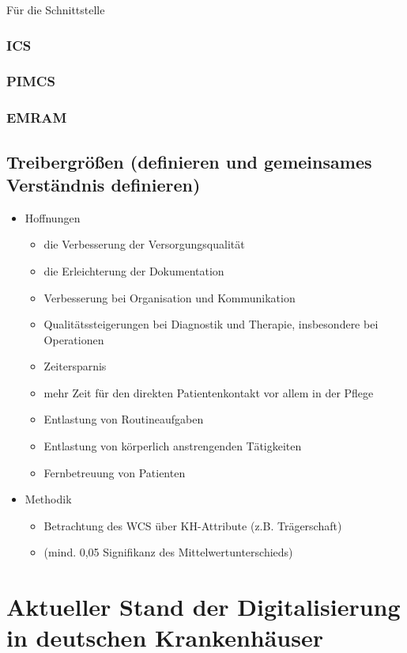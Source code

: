 		Für die Schnittstelle
	\subsubsection{ICS}
	\subsubsection{PIMCS}
	\subsubsection{EMRAM}
	\parencite{Stephani2019}
	\subsection{Treibergrößen (definieren und gemeinsames Verständnis definieren)}
	\begin{itemize}
		\item Hoffnungen \parencite[15]{braeutigam2017}
		\begin{itemize}
			\item die Verbesserung der Versorgungsqualität
			\item die Erleichterung der Dokumentation
			\item Verbesserung bei Organisation und Kommunikation
			\item Qualitätssteigerungen bei Diagnostik und Therapie, insbesondere bei Operationen
			\item Zeitersparnis
			\item mehr Zeit für den direkten Patientenkontakt vor allem in der Pflege
			\item Entlastung von Routineaufgaben
			\item Entlastung von körperlich anstrengenden Tätigkeiten
			\item Fernbetreuung von Patienten
		\end{itemize}
	\end{itemize}
	\begin{itemize}
		\item Methodik
		\begin{itemize}
			\item Betrachtung des WCS über KH-Attribute (z.B. Trägerschaft)
			\item (mind. 0,05 Signifikanz des Mittelwertunterschieds)
		\end{itemize}
	\end{itemize}
\section{Aktueller Stand der Digitalisierung in deutschen Krankenhäuser} \label{sec:stand in deutschland}
